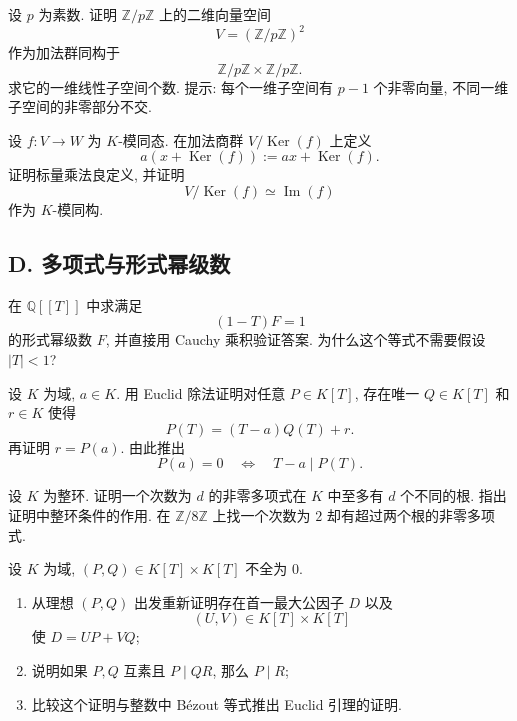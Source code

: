 \documentclass[usesamecnt, thmcnt=section, lang=cn, newtx, 10pt, scheme=chinese]{elegantbook}
\begin{document}
\begin{exercise}\label{ex:alg-end-14}
设 $p$ 为素数. 证明 $\mathbb Z/p\mathbb Z$ 上的二维向量空间
\[
 V=(\mathbb Z/p\mathbb Z)^2
\]
作为加法群同构于
\[
 \mathbb Z/p\mathbb Z\times\mathbb Z/p\mathbb Z.
\]
求它的一维线性子空间个数. 提示: 每个一维子空间有 $p-1$ 个非零向量, 不同一维子空间的非零部分不交.
\end{exercise}

\begin{exercise}\label{ex:alg-end-15}
设 $f:V\to W$ 为 $K$-模同态. 在加法商群 $V/\operatorname{Ker}(f)$ 上定义
\[
 a(x+\operatorname{Ker}(f)):=ax+\operatorname{Ker}(f).
\]
证明标量乘法良定义, 并证明
\[
 V/\operatorname{Ker}(f)\simeq\operatorname{Im}(f)
\]
作为 $K$-模同构.
\end{exercise}

\subsection*{D. 多项式与形式幂级数}

\begin{exercise}\label{ex:alg-end-16}
在 $\mathbb Q[\![T]\!]$ 中求满足
\[
 (1-T)F=1
\]
的形式幂级数 $F$, 并直接用 Cauchy 乘积验证答案. 为什么这个等式不需要假设 $|T|<1$?
\end{exercise}

\begin{exercise}\label{ex:alg-end-17}
设 $K$ 为域, $a\in K$. 用 Euclid 除法证明对任意 $P\in K[T]$, 存在唯一 $Q\in K[T]$ 和 $r\in K$ 使得
\[
 P(T)=(T-a)Q(T)+r.
\]
再证明 $r=P(a)$. 由此推出
\[
 P(a)=0\quad\Longleftrightarrow\quad T-a\mid P(T).
\]
\end{exercise}

\begin{exercise}\label{ex:alg-end-18}
设 $K$ 为整环. 证明一个次数为 $d$ 的非零多项式在 $K$ 中至多有 $d$ 个不同的根. 指出证明中整环条件的作用. 在 $\mathbb Z/8\mathbb Z$ 上找一个次数为 $2$ 却有超过两个根的非零多项式.
\end{exercise}

\begin{challenge}\label{ch:alg-02}
设 $K$ 为域, $(P,Q)\in K[T]\times K[T]$ 不全为 $0$.
\begin{enumerate}[label=\rm(\arabic*)]
  \item 从理想 $(P,Q)$ 出发重新证明存在首一最大公因子 $D$ 以及
  \[
   (U,V)\in K[T]\times K[T]
  \]
  使 $D=UP+VQ$;
  \item 说明如果 $P,Q$ 互素且 $P\mid QR$, 那么 $P\mid R$;
  \item 比较这个证明与整数中 Bézout 等式推出 Euclid 引理的证明.
\end{enumerate}
\end{challenge}
\end{document}
